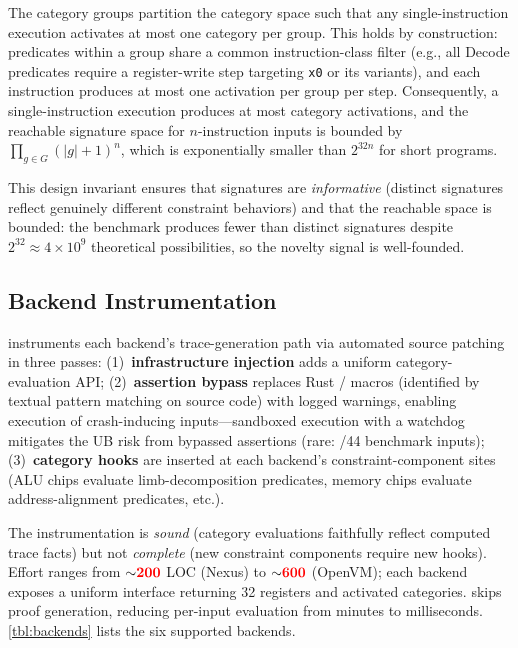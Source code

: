 \begin{proposition}\label{prop:category-separation}
The  category groups partition the category space such that any single-instruction execution activates at most one category per group. This holds by construction: predicates within a group share a common instruction-class filter (e.g., all Decode predicates require a register-write step targeting \texttt{x0} or its variants), and each instruction produces at most one activation per group per step. Consequently, a single-instruction execution produces at most  category activations, and the reachable signature space for $n$-instruction inputs is bounded by $\prod_{g \in G} (|g| + 1)^n$, which is exponentially smaller than $2^{32n}$ for short programs.
\end{proposition}

\noindent This design invariant ensures that signatures are \emph{informative} (distinct signatures reflect genuinely different constraint behaviors) and that the reachable space is bounded: the benchmark produces fewer than  distinct signatures despite $2^{32} \approx 4 \times 10^9$ theoretical possibilities, so the novelty signal is well-founded.

\subsection{Backend Instrumentation}\label{sec:instrumentation}

\tool instruments each backend's trace-generation path via automated source patching in three passes: (1)~\textbf{infrastructure injection} adds a uniform category-evaluation API; (2)~\textbf{assertion bypass} replaces Rust / macros (identified by textual pattern matching on source code) with logged warnings, enabling execution of crash-inducing inputs---sandboxed execution with a watchdog mitigates the UB risk from bypassed assertions (rare: /44 benchmark inputs); (3)~\textbf{category hooks} are inserted at each backend's constraint-component sites (ALU chips evaluate limb-decomposition predicates, memory chips evaluate address-alignment predicates, etc.).

The instrumentation is \emph{sound} (category evaluations faithfully reflect computed trace facts) but not \emph{complete} (new constraint components require new hooks). Effort ranges from ${\sim}{{\color{red}{{{\bf 200}}}}}$ LOC (Nexus) to ${\sim}{{\color{red}{{{\bf 600}}}}}$ (OpenVM); each backend exposes a uniform interface returning 32 registers and activated categories. \tool skips proof generation, reducing per-input evaluation from minutes to milliseconds. \autoref{tbl:backends} lists the six supported backends.

